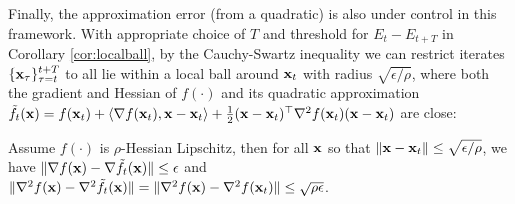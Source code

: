 Finally, the approximation error (from a quadratic) is also under control in this framework. With appropriate choice of $T$ and threshold for $E_t - E_{t+T}$ in Corollary \ref{cor:localball}, by the Cauchy-Swartz inequality we can restrict iterates $\{\mathbf{x}_\tau\}_{\tau = t}^{t+T}$ to all lie within a local ball around $\mathbf{x}_t$ with radius $\sqrt{\epsilon/\rho}$, where both the gradient and Hessian of $f(\cdot)$ and its quadratic approximation
$\tilde{f}_t(\mathbf{x}) = f(\mathbf{x}_t) + \langle \nabla f(\mathbf{x}_t), \mathbf{x} - \mathbf{x}_t\rangle + \frac{1}{2} (\mathbf{x} - \mathbf{x}_t)^{\top} \nabla^2 f(\mathbf{x}_t) (\mathbf{x} - \mathbf{x}_t)$ are close:
\begin{fact}
Assume $f(\cdot)$ is $\rho$-Hessian Lipschitz, then for all $\mathbf{x}$ so that $\left\|{\mathbf{x} - \mathbf{x}_t}\right\| \le \sqrt{\epsilon/\rho}$, 
we have $\|\nabla f(\mathbf{x}) - \nabla \tilde{f}_t(\mathbf{x})\| \le \epsilon$ and $\| \nabla^2 f(\mathbf{x}) - \nabla^2 \tilde{f}_t(\mathbf{x})\|
= \| \nabla^2 f(\mathbf{x}) - \nabla^2 f(\mathbf{x}_t) \|\le \sqrt{\rho\epsilon}$.
\end{fact}
